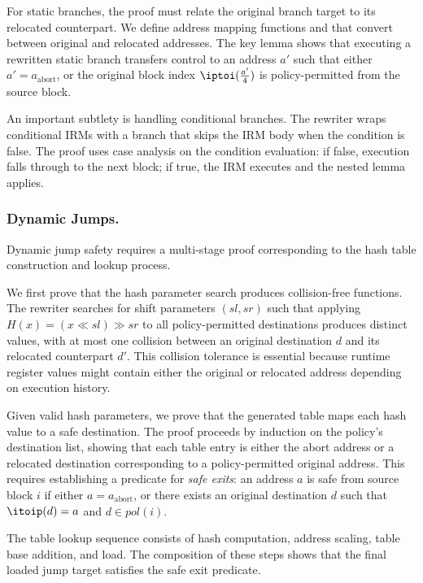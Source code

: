 For static branches, the proof must relate the original branch target to its relocated counterpart.
We define address mapping functions \itoip and \iptoi that convert between original and relocated addresses.
The key lemma shows that executing a rewritten static branch transfers control to an address $a'$ such that either $a' = a_\mathrm{abort}$, or the original block index $\iptoi(\frac{a'}{4})$ is policy-permitted from the source block.

An important subtlety is handling conditional branches.
The rewriter wraps conditional IRMs with a branch that skips the IRM body when the condition is false.
The proof uses case analysis on the condition evaluation: if false, execution falls through to the next block; if true, the IRM executes and the nested lemma applies.

\subsubsection{Dynamic Jumps.}


Dynamic jump safety requires a multi-stage proof corresponding to the hash table construction and lookup process.

We first prove that the hash parameter search produces collision-free functions.
The rewriter searches for shift parameters $(sl, sr)$ such that applying $H(x) = (x \ll sl) \gg sr$ to all policy-permitted destinations produces distinct values, with at most one collision between an original destination $d$ and its relocated counterpart $d'$.
This collision tolerance is essential because runtime register values might contain either the original or relocated address depending on execution history.

Given valid hash parameters, we prove that the generated table maps each hash value to a safe destination.
The proof proceeds by induction on the policy's destination list, showing that each table entry is either the abort address or a relocated destination corresponding to a policy-permitted original address.
This requires establishing a predicate for \emph{safe exits}: an address $a$ is safe from source block $i$ if either $a = a_\mathrm{abort}$, or there exists an original destination $d$ such that $\itoip(d) = a$ and $d \in \mathit{pol}(i)$.

The table lookup sequence consists of hash computation, address scaling, table base addition, and load.
The composition of these steps shows that the final loaded jump target satisfies the safe exit predicate.


